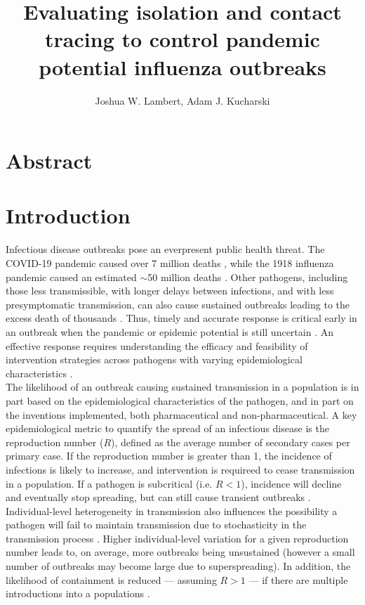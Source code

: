 \documentclass{article}
\title{Evaluating isolation and contact tracing to control pandemic potential influenza outbreaks}
\author{Joshua W. Lambert, Adam J. Kucharski}
\date{}
\begin{document}
\maketitle

\section*{Abstract}

\section*{Introduction}

Infectious disease outbreaks pose an everpresent public health threat. The COVID-19 pandemic caused over 7 million deaths \citep{whocovid-19dashboardCOVID19DeathsWHO}, while the 1918 influenza pandemic caused an estimated $\sim$50 million deaths \citep{johnsonUpdatingAccountsGlobal2002}. Other pathogens, including those less transmissible, with longer delays between infections, and with less presymptomatic transmission, can also cause sustained outbreaks leading to the excess death of thousands \citep{whoebolaresponseteamEbolaVirusDisease2014}. Thus, timely and accurate response is critical early in an outbreak when the pandemic or epidemic potential is still uncertain \citep{kucharskiControllingMinorOutbreaks2024}. An effective response requires understanding the efficacy and feasibility of intervention strategies across pathogens with varying epidemiological characteristics \citep{fraserFactorsThatMake2004}. \\

The likelihood of an outbreak causing sustained transmission in a population is in part based on the epidemiological characteristics of the pathogen, and in part on the inventions implemented, both pharmaceutical and non-pharmaceutical. A key epidemiological metric to quantify the spread of an infectious disease is the reproduction number ($R$), defined as the average number of secondary cases  per primary case. If the reproduction number is greater than 1, the incidence of infections is likely to increase, and intervention is requireed to cease transmission in a population. If a pathogen is subcritical (i.e. $R < 1$), incidence will decline and eventually stop spreading, but can still cause transient outbreaks \citep{farringtonDistributionTimeExtinction1999}. Individual-level heterogeneity in transmission also influences the possibility a pathogen will fail to maintain transmission due to stochasticity in the transmission process \citep{lloyd-smithSuperspreadingEffectIndividual2005}. Higher individual-level variation for a given reproduction number leads to, on average, more outbreaks being unsustained (however a small number of outbreaks may become large due to superspreading). In addition, the likelihood of containment is reduced --- assuming $R > 1$ --- if there are multiple introductions into a populations \citep{whittleOutcomeStochasticEpidemicA1955, kucharskiEarlyDynamicsTransmission2020}. \\
\end{document}
